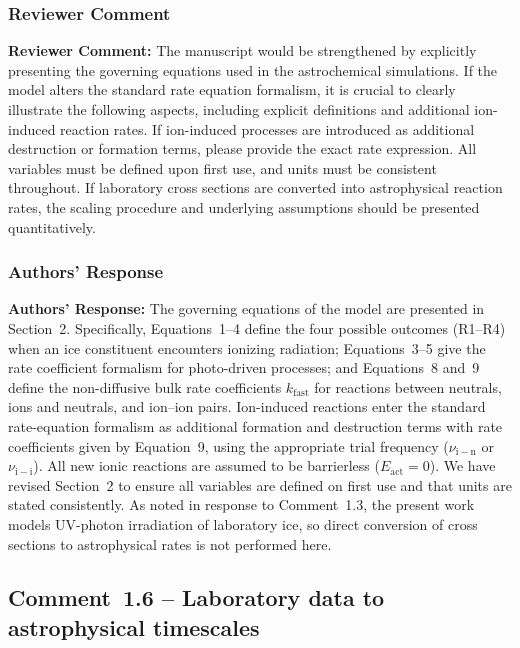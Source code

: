 \documentclass[12pt]{article}
\newcommand{\reviewlabel}{\textbf{\textcolor{commentframe}{Reviewer Comment:}}}
\newcommand{\responselabel}{\textbf{\textcolor{responseframe}{Authors' Response:}}}
\begin{document}
\subsubsection{Reviewer Comment}
\begin{reviewerbox}
\reviewlabel{} The manuscript would be strengthened by explicitly presenting
the governing equations used in the astrochemical simulations. If the model
alters the standard rate equation formalism, it is crucial to clearly
illustrate the following aspects, including explicit definitions and additional
ion-induced reaction rates. If ion-induced processes are introduced as
additional destruction or formation terms, please provide the exact rate
expression. All variables must be defined upon first use, and units must be
consistent throughout. If laboratory cross sections are converted into
astrophysical reaction rates, the scaling procedure and underlying assumptions
should be presented quantitatively.
\end{reviewerbox}

\subsubsection{Authors' Response}
\begin{responsebox}
\responselabel{} The governing equations of the model are presented in
Section~2. Specifically, Equations~1--4 define the four possible outcomes (R1--R4) when an ice constituent encounters ionizing radiation; Equations~3--5 give the rate coefficient formalism for photo-driven processes; and Equations~8 and~9 define the non-diffusive bulk rate coefficients $k_\mathrm{fast}$ for reactions between neutrals, ions and neutrals, and ion--ion pairs. Ion-induced reactions enter the standard rate-equation formalism as additional formation and destruction terms with rate coefficients given by Equation~9, using the appropriate trial frequency ($\nu_\mathrm{i-n}$ or $\nu_\mathrm{i-i}$). All new ionic reactions are assumed to be barrierless ($E_\mathrm{act} = 0$). We have revised Section~2 to ensure all variables are defined on first use and that units are stated consistently. As noted in response to Comment~1.3, the present work models UV-photon irradiation of laboratory ice, so direct conversion of cross sections to astrophysical rates is not performed here.
\end{responsebox}

\subsection{Comment~1.6 -- Laboratory data to astrophysical timescales}
\end{document}
